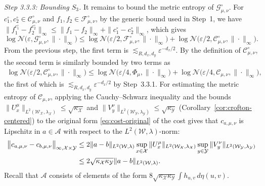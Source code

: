 \documentclass[11pt]{amsart}
\theoremstyle{definition}
\theoremstyle{remark}
\newcommand{\1}{\mathbf{1}}
\numberwithin{equation}{section}
\begin{document}
\emph{Step 3.3.3: Bounding $S_3$.}
It remains to bound the metric entropy of
$\mathcal G^\circ_{\mu,\nu}$. For
$c^\circ_1, c^\circ_2 \in \mathcal C^\circ_{\mu,\nu}$ and
$f_1,f_2 \in \mathcal F^\circ_{\mu,\nu}$, by the generic bound used
in Step~1, we have
$\|f_1^{c^\circ_1} - f_2^{c^\circ_2}\|_\infty
\leq \|f_1-f_2\|_\infty + \|c^\circ_1-c^\circ_2\|_\infty$, which gives
\begin{equation}\label{eq:metric-entropy-tildeG}
\log \mathcal N\bigl(\varepsilon,\mathcal G^\circ_{\mu,\nu},
\|\cdot\|_\infty\bigr)
\le
\log \mathcal N\bigl(\varepsilon/2,\mathcal F^\circ_{\mu,\nu},
\|\cdot\|_\infty\bigr)
+ \log \mathcal N\bigl(\varepsilon/2,\mathcal C^\circ_{\mu,\nu},
\|\cdot\|_\infty\bigr).
\end{equation}
From the previous step, the first term is
$\lesssim_{R,d_x,d_y}\varepsilon^{-d_x/2}$. By the definition of
$\mathcal C^\circ_{\mu,\nu}$, the second term is similarly bounded by two terms
as
\begin{align} \label{eq:metric-entropy-tildeC}
    \log \mathcal N\bigl(\varepsilon/2,\mathcal C^\circ_{\mu,\nu},
\|\cdot\|_\infty\bigr)
\leq \log \mathcal N\bigl(\varepsilon/4,\Phi_{\mu},
\|\cdot\|_\infty\bigr)
+\log \mathcal N\bigl(\varepsilon/4,\mathcal C_{\mu,\nu},
\|\cdot\|_\infty\bigr),
\end{align}
the first of which is $\lesssim_{R,d_x,d_y}\varepsilon^{-d_x/2}$ by
Step~3.3.1. For estimating the metric entropy of $\mathcal C_{\mu,\nu}$,
applying the Cauchy--Schwarz inequality and the bounds
$\|U_x^\mu\|_{L^2(\mathcal W_\mathcal X,\lambda_\mathcal X)} \leq \sqrt{\kappa_{\mathcal{X}}}$ and
$\|V_y^\nu\|_{L^2(\mathcal W_\mathcal Y,\lambda_\mathcal Y)} \leq \sqrt{\kappa_{\mathcal{Y}}}$
(Corollary~\ref{cor:crofton-centered}) to the original form
\eqref{eq:cost-original} of the cost gives that $c_{a,\mu,\nu}$ is
Lipschitz in $a\in \mathcal{A}$ with respect to the
$L^2(\mathcal{W},\lambda)$-norm:
\begin{align}
\bigl\|c_{a,\mu,\nu}-c_{b,\mu,\nu}\bigr\|_{\infty, \mathcal{X}\times \mathcal{Y}}
&\leq
2\|a-b\|_{L^2(\mathcal W,\lambda)}
\sup_{x\in\mathcal X}\|U_x^\mu\|_{L^2(\mathcal W_{\mathcal X},\lambda_{\mathcal X})}
\sup_{y\in\mathcal Y}\|V_y^\nu\|_{L^2(\mathcal W_{\mathcal Y},\lambda_{\mathcal Y})} \notag \\
&\leq 2\sqrt{\kappa_{\mathcal X}\kappa_{\mathcal Y}}\|a-b\|_{L^2(\mathcal{W}, \lambda)}. \label{eq:lipschitz-of-c}
\end{align}
Recall that $\mathcal{A}$ consists of elements of the form
$8\sqrt{\kappa_{\mathcal{X}}\kappa_{\mathcal{Y}}}\int h_{u,v}\,d\eta(u,v)$.
\end{document}
